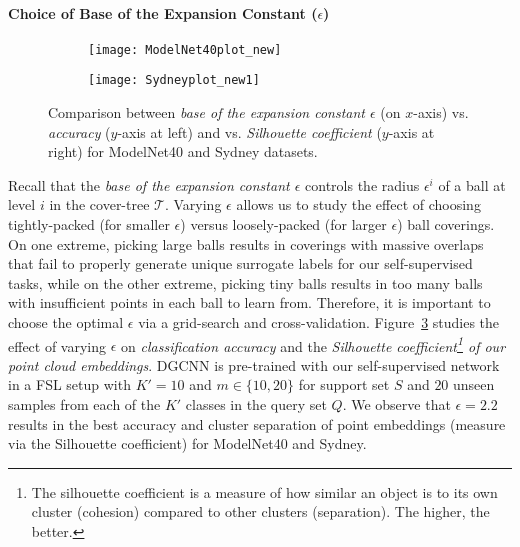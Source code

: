 \documentclass{article}
\newcommand{\mT}{\mathcal{T}}
\begin{document}
\paragraph{Choice of Base of the Expansion Constant ($\epsilon$)}
\begin{figure}[tbp]
\centering
	\begin{subfigure}{.5\textwidth}
		\centering
		\texttt{[image: ModelNet40plot\_new]}
		\label{fig:sub1}
	\end{subfigure}\begin{subfigure}{.5\textwidth}
		\centering
		\texttt{[image: Sydneyplot\_new1]}
		\label{fig:sub2}
	\end{subfigure}
	\caption{Comparison between 
		\emph{base of the expansion constant $\epsilon$} (on $x$-axis) vs. \emph{accuracy} ($y$-axis at left) and vs. \emph{Silhouette coefficient} ($y$-axis at right) for ModelNet40 and Sydney datasets.}
	\label{fig:density}
\end{figure}
Recall that the \emph{base of the expansion constant $\epsilon$} controls the radius $\epsilon^i$ of a ball at level $i$ in the cover-tree $\mT$. Varying $\epsilon$ allows us to study the effect of choosing tightly-packed (for smaller $\epsilon$) versus loosely-packed (for larger $\epsilon$) ball coverings. 
On one extreme, picking large balls results in coverings with massive overlaps that fail to properly generate unique surrogate labels for our self-supervised tasks, while on the other extreme, picking tiny balls results in too many balls with insufficient points in each ball to learn from.
Therefore, it is important to choose the optimal $\epsilon$ via a grid-search and cross-validation.
Figure~\ref{fig:density} studies the effect of varying $\epsilon$ on \emph{classification accuracy} and the \emph{Silhouette coefficient\footnote{The silhouette coefficient is a measure of how similar an object is to its own cluster (cohesion) compared to other clusters (separation). The higher, the better.} of our point cloud embeddings}. DGCNN is pre-trained with our self-supervised network in a FSL setup with $K'=10$ and $m \in \{10,20\}$ for support set $S$ and $20$ unseen samples from each of the $K'$ classes in the query set $Q$.
We observe that $\epsilon=2.2$ results in the best accuracy and cluster separation of point embeddings (measure via the Silhouette coefficient) for ModelNet40 and Sydney.
\end{document}
